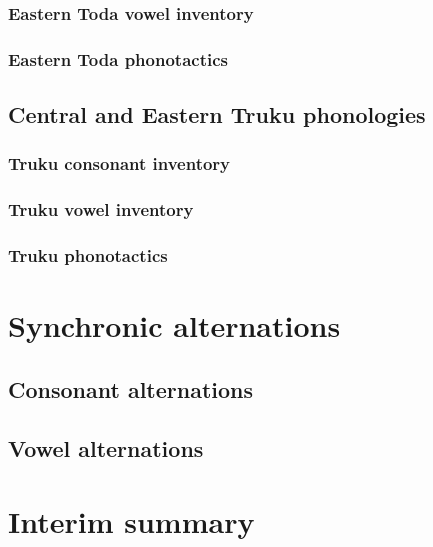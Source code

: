 \subsubsection{Eastern Toda vowel inventory}
\subsubsection{Eastern Toda phonotactics}

\subsection{Central and Eastern Truku phonologies}
\lipsum[1]

\subsubsection{Truku consonant inventory}
\subsubsection{Truku vowel inventory}
\subsubsection{Truku phonotactics}

\section{Synchronic alternations}
\lipsum[1]
\subsection{Consonant alternations}
\lipsum[1]
\subsection{Vowel alternations}
\lipsum[1]

\section{Interim summary}
\lipsum[1]